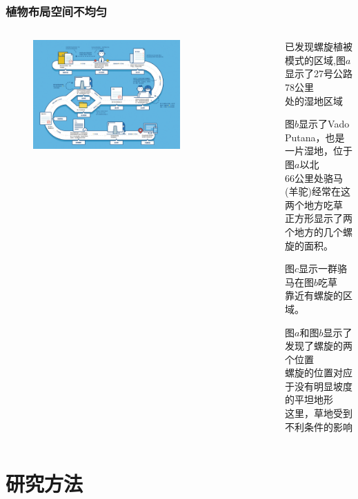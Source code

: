 \documentclass[aspectratio=169, 12pt, utf8, mathserif]{ctexbeamer} %
\begin{document}
	
\begin{frame}
	\frametitle{植物布局空间不均匀}
	\begin{columns}
		\column{0.3\paperwidth} %
		\begin{figure}[tbph]
			\centering
			\includegraphics[width=0.7\textwidth]{figures/4}
		\end{figure}
		
		\column{0.8\paperwidth}
		\begin{enumerate}%
{\small 			
	        \item 已发现螺旋植被模式的区域,图\(a\)显示了27号公路78公里\\处的湿地区域
			\item 图\(b\)显示了Vado Putana，也是一片湿地，位于图\(a\)以北\\
			66公里处骆马(羊驼)经常在这两个地方吃草\\
			正方形显示了两个地方的几个螺旋的面积。
			\item  图\(c\)显示一群骆马在图\(b\)吃草
			\\靠近有螺旋的区域。
			\item 图\(a\)和图\(b\)显示了发现了螺旋的两个位置\\
			螺旋的位置对应于没有明显坡度的平坦地形
			\\这里，草地受到不利条件的影响}
		\end{enumerate}
	\end{columns}
\end{frame}	





	

\section{研究方法}
\end{document}

